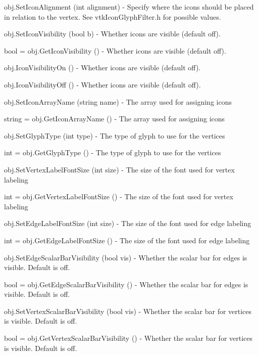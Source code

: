\begin{DoxyItemize}
\item {\ttfamily obj.\-Set\-Icon\-Alignment (int alignment)} -\/ Specify where the icons should be placed in relation to the vertex. See vtk\-Icon\-Glyph\-Filter.\-h for possible values.  
\item {\ttfamily obj.\-Set\-Icon\-Visibility (bool b)} -\/ Whether icons are visible (default off).  
\item {\ttfamily bool = obj.\-Get\-Icon\-Visibility ()} -\/ Whether icons are visible (default off).  
\item {\ttfamily obj.\-Icon\-Visibility\-On ()} -\/ Whether icons are visible (default off).  
\item {\ttfamily obj.\-Icon\-Visibility\-Off ()} -\/ Whether icons are visible (default off).  
\item {\ttfamily obj.\-Set\-Icon\-Array\-Name (string name)} -\/ The array used for assigning icons  
\item {\ttfamily string = obj.\-Get\-Icon\-Array\-Name ()} -\/ The array used for assigning icons  
\item {\ttfamily obj.\-Set\-Glyph\-Type (int type)} -\/ The type of glyph to use for the vertices  
\item {\ttfamily int = obj.\-Get\-Glyph\-Type ()} -\/ The type of glyph to use for the vertices  
\item {\ttfamily obj.\-Set\-Vertex\-Label\-Font\-Size (int size)} -\/ The size of the font used for vertex labeling  
\item {\ttfamily int = obj.\-Get\-Vertex\-Label\-Font\-Size ()} -\/ The size of the font used for vertex labeling  
\item {\ttfamily obj.\-Set\-Edge\-Label\-Font\-Size (int size)} -\/ The size of the font used for edge labeling  
\item {\ttfamily int = obj.\-Get\-Edge\-Label\-Font\-Size ()} -\/ The size of the font used for edge labeling  
\item {\ttfamily obj.\-Set\-Edge\-Scalar\-Bar\-Visibility (bool vis)} -\/ Whether the scalar bar for edges is visible. Default is off.  
\item {\ttfamily bool = obj.\-Get\-Edge\-Scalar\-Bar\-Visibility ()} -\/ Whether the scalar bar for edges is visible. Default is off.  
\item {\ttfamily obj.\-Set\-Vertex\-Scalar\-Bar\-Visibility (bool vis)} -\/ Whether the scalar bar for vertices is visible. Default is off.  
\item {\ttfamily bool = obj.\-Get\-Vertex\-Scalar\-Bar\-Visibility ()} -\/ Whether the scalar bar for vertices is visible. Default is off.  

\end{DoxyItemize}
